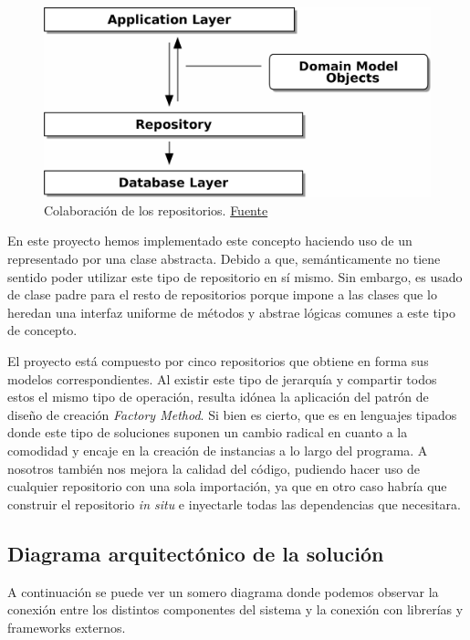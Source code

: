 \FloatBarrier
\begin{figure}[h]
	\centering	
	\includegraphics[width=\textwidth]{doc/logos/imgs/repopattern.png}
    \caption{Colaboración de los repositorios.
    \href{https://www.cosmicpython.com/book/images/apwp_0205.png}{Fuente}}
    \label{fig:repo-pattern}
\end{figure}
\FloatBarrier

En este proyecto hemos implementado este concepto haciendo uso de un
 representado por una clase abstracta. Debido a que,
semánticamente no tiene sentido poder utilizar este tipo de repositorio en sí mismo. Sin
embargo, es usado de clase padre para el resto de repositorios porque impone a las clases
que lo heredan una interfaz uniforme de métodos y abstrae lógicas comunes a este tipo de
concepto.

El proyecto está compuesto por cinco repositorios que obtiene en forma sus modelos
correspondientes. Al existir este tipo de jerarquía y compartir todos estos el mismo tipo
de operación, resulta idónea la aplicación del patrón de diseño de creación
\textit{Factory Method}. Si bien es cierto, que es en lenguajes tipados donde este tipo de
soluciones suponen un cambio radical en cuanto a la comodidad y encaje en la creación de
instancias a lo largo del programa. A nosotros también nos mejora la calidad del código,
pudiendo hacer uso de cualquier repositorio con una sola importación, ya que en otro caso
habría que construir el repositorio \textit{in situ} e inyectarle todas las dependencias
que necesitara.


\subsection{Diagrama arquitectónico de la solución}
A continuación se puede ver un somero diagrama donde podemos observar la conexión entre
los distintos componentes del sistema y la conexión con librerías y frameworks externos. 

